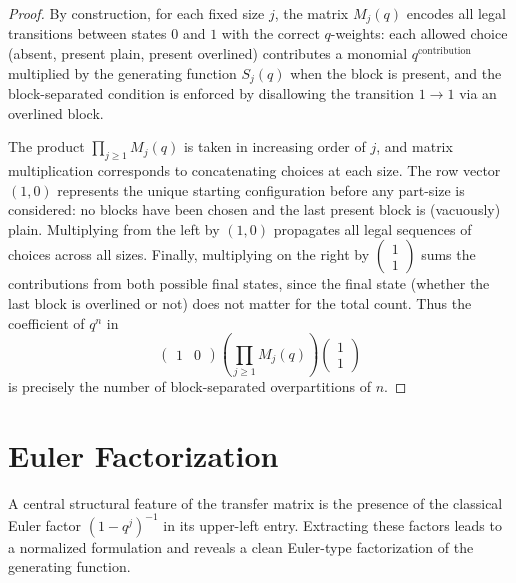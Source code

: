 \documentclass[letterpaper,12pt]{article}
\begin{document}
\begin{proof}
By construction, for each fixed size \(j\), the matrix \(M_j(q)\) encodes all
legal transitions between states \(0\) and \(1\) with the correct \(q\)-weights:
each allowed choice (absent, present plain, present overlined) contributes a
monomial \(q^{\text{contribution}}\) multiplied by the generating function
\(S_j(q)\) when the block is present, and the block-separated condition is
enforced by disallowing the transition \(1\to1\) via an overlined block.

The product \(\prod_{j\ge1} M_j(q)\) is taken in increasing order of \(j\), and
matrix multiplication corresponds to concatenating choices at each size. The
row vector \((1,0)\) represents the unique starting configuration before any
part-size is considered: no blocks have been chosen and the last present block
is (vacuously) plain. Multiplying from the left by \((1,0)\) propagates all
legal sequences of choices across all sizes. Finally, multiplying on the right
by \(\begin{pmatrix}1\\1\end{pmatrix}\) sums the contributions from
both possible final states, since the final state (whether the last block is
overlined or not) does not matter for the total count. Thus the coefficient
of \(q^n\) in
\[
\begin{pmatrix} 1 & 0 \end{pmatrix}
\left(\prod_{j\ge1} M_j(q)\right)
\begin{pmatrix} 1 \\ 1 \end{pmatrix}
\]
is precisely the number of block-separated overpartitions of \(n\).
\end{proof}


\section{Euler Factorization}\label{sec:Euler}
A central structural feature of the transfer matrix is the presence of the classical Euler factor $(1-q^j)^{-1}$ in its upper-left entry. 
Extracting these factors leads to a normalized formulation and reveals a clean Euler-type factorization of the generating function.
\end{document}
